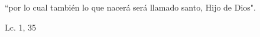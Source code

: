 \documentclass[../../rosario.tex]{subfiles}
\begin{document}
    ``por lo cual también lo que nacerá será llamado santo, Hijo de Dios".
    \begin{flushright}
    Lc. 1, 35
    \end{flushright}
\end{document}
